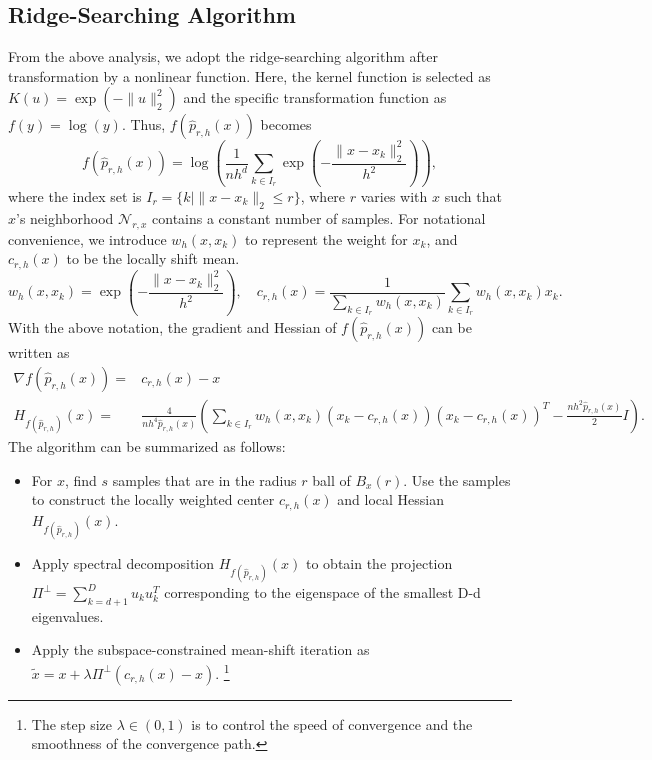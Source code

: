 \documentclass[aos,preprint]{imsart}
\theoremstyle{remark}
\begin{document}
\subsection{Ridge-Searching Algorithm}
From the above analysis, we adopt the ridge-searching algorithm after transformation by a nonlinear function. Here, the kernel function is selected as $K(u) = \exp(-\|u\|_2^2)$ and the specific transformation function as $f(y) = \log(y)$. Thus, $f(\hat{p}_{r,h}(x))$ becomes
\[
f(\hat{p}_{r,h}(x)) = \log(\frac{1}{n h^d}\sum_{k\in I_{r}} \exp(-\frac{\|x-x_k\|_2^2}{h^2}) ),
\]
where the index set is $I_{r} = \{ k | \|x-x_k\|_2\leq r \}$, where $r$ varies with $x$ such that $x$'s neighborhood ${\mathcal N}_{r,x}$ contains a constant number of samples. For notational convenience, we introduce $w_h(x, x_k)$ to represent the weight for $x_k$, and $c_{r,h}(x)$ to be the locally shift mean.
\[
w_h(x, x_k) = \exp(-\frac{\|x-x_k\|_2^2}{h^2}), \quad c_{r,h}(x) = \frac{1}{\sum_{k\in I_r} w_h(x,x_k)}\sum_{k\in I_r} w_h(x, x_k)x_k.
\]
With the above notation, the gradient and Hessian of $f(\hat{p}_{r,h}(x))$ can be written as
\[
\begin{aligned}
\nabla f(\hat{p}_{r,h}(x)) = &c_{r,h}(x) - x\\
H_{f(\hat{p}_{r,h})}(x) = &\frac{4}{n h^4 \hat{p}_{r,h}(x)}(\sum_{k\in I_r} w_h(x,x_k) (x_k - c_{r,h}(x))(x_k - c_{r,h}(x))^T
-\frac{n h^2 \hat{p}_{r,h}(x)}{2}I).
\end{aligned}
\]
The algorithm can be summarized as follows:
\begin{itemize}
\item For $x$, find $s$ samples that are in the radius $r$ ball of $B_x(r)$. Use the samples to construct the locally weighted center $c_{r,h}(x)$ and local Hessian $H_{f(\hat{p}_{r,h})}(x)$.
\item Apply spectral decomposition $H_{f(\hat{p}_{r,h})}(x)$ to obtain the projection $\Pi^{\perp}=\sum_{k = d+1}^D u_k u_k^T $ corresponding to the eigenspace of  the smallest D-d  eigenvalues. 
\item Apply the subspace-constrained mean-shift iteration as $\tilde{x} = x + \lambda \Pi^\perp (c_{r,h}(x) - x)$. 
\footnote{The step size $\lambda\in (0,1)$ is to control the speed of convergence and the smoothness of the convergence path.}
\end{itemize}
\end{document}

